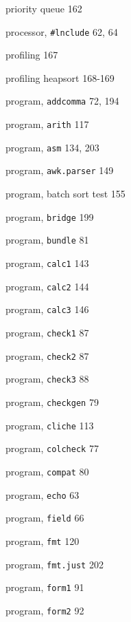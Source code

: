 \begin{multicols}{3}
\hangindent=3pc  priority queue 162

\hangindent=3pc  processor, \verb'#lnclude' 62, 64

\hangindent=3pc  profiling 167

\hangindent=3pc  profiling heapsort 168-169

\hangindent=3pc  program, \verb'addcomma' 72, 194

\hangindent=3pc  program, \verb'arith' 117

\hangindent=3pc  program, \verb'asm' 134, 203

\hangindent=3pc  program, \verb'awk.parser' 149

\hangindent=3pc  program, batch sort test 155

\hangindent=3pc  program, \verb'bridge' 199

\hangindent=3pc  program, \verb'bundle' 81

\hangindent=3pc  program, \verb'calc1' 143

\hangindent=3pc  program, \verb'calc2' 144

\hangindent=3pc  program, \verb'calc3' 146

\hangindent=3pc  program, \verb'check1' 87

\hangindent=3pc  program, \verb'check2' 87

\hangindent=3pc  program, \verb'check3' 88

\hangindent=3pc  program, \verb'checkgen' 79

\hangindent=3pc  program, \verb'cliche' 113

\hangindent=3pc  program, \verb'colcheck' 77

\hangindent=3pc  program, \verb'compat' 80

\hangindent=3pc  program, \verb'echo' 63

\hangindent=3pc  program, \verb'field' 66

\hangindent=3pc  program, \verb'fmt' 120

\hangindent=3pc  program, \verb'fmt.just' 202

\hangindent=3pc  program, \verb'form1' 91

\hangindent=3pc  program, \verb'form2' 92


\end{multicols}

